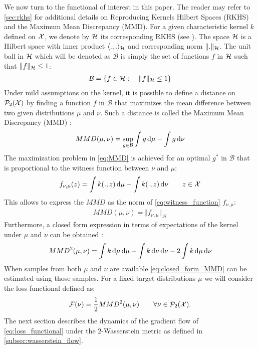We now turn to the functional of interest in this paper. The reader may refer to \cref{sec:rkhs} for additional details on Reproducing Kernels Hilbert Spaces (RKHS) and the Maximum Mean Discrepancy (MMD). For a given characteristic kernel $k$ defined on ${{\mathcal X}}$, we denote by ${{\mathcal H}}$ its corresponding RKHS (see \cite{smola1998learning}). The space ${{\mathcal H}}$ is a Hilbert space with inner product $\langle .,. \rangle_{{{\mathcal H}}}$ and corresponding norm $\Vert . \Vert_{{{\mathcal H}}}$. The unit ball in ${{\mathcal H}}$ which will be denoted as $\mathcal{B}$ is simply the set of functions $f$ in ${{\mathcal H}}$ such that $\Vert f\Vert_{{{\mathcal H}}}\leq 1 $:
\begin{align}\label{eq:unit_ball_RKHS}
\mathcal{B} = \{ f\in {{\mathcal H}} : \quad \Vert f\Vert_{{{\mathcal H}}}\leq 1 \}
\end{align}
 Under mild assumptions on the kernel, it is possible to define a distance on $\mathcal{P}_2({{\mathcal X}})$ by finding a function $f$ in $\mathcal{B}$ that maximizes the mean difference between two given distributions $\mu$ and $\nu$. Such a distance is called the Maximum Mean Discrepancy  (MMD) \cite{Gretton:2012}:
\begin{align}\label{eq:MMD}
MMD(\mu,\nu) = \sup_{g\in \mathcal{B}} \int g\mathop{}\!\mathrm{d}\mu - \int g \mathop{}\!\mathrm{d}\nu
\end{align}
The maximization problem in \cref{eq:MMD} is achieved for an optimal $g^*$ in $\mathcal{B}$ that is proportional to the  witness function between $\nu$ and $\mu$:
\begin{align}\label{eq:witness_function}
f_{\nu,\mu}(z) = \int k(.,z)\mathop{}\!\mathrm{d} \mu - \int k(.,z)\mathop{}\!\mathrm{d} \nu  \qquad z\in {{\mathcal X}}
\end{align}
This allows to express the $MMD$ as the norm of \cref{eq:witness_function} $f_{\nu,\mu}$:
\begin{align}\label{eq:mmd_norm_witness}
MMD(\mu,\nu) = \Vert f_{\nu,\mu} \Vert_{\mathcal{H}} 
\end{align}
Furthermore, a closed form expression in terms of expectations of the kernel under $\mu$ and $\nu$ can be obtained \cite{gretton2012kernel}:
\begin{align}\label{eq:closed_form_MMD}
MMD^2(\mu,\nu) = \int k\mathop{}\!\mathrm{d}\mu \mathop{}\!\mathrm{d}\mu + \int k\mathop{}\!\mathrm{d}\nu \mathop{}\!\mathrm{d} \nu - 2\int k\mathop{}\!\mathrm{d}\mu \mathop{}\!\mathrm{d} \nu
\end{align}
When samples from both $\mu$ and $\nu$ are available \cref{eq:closed_form_MMD} can be estimated using those samples. For a fixed target distributions $\mu$ we will consider the loss functional defined as:
\begin{align}\label{eq:loss_functional}
{{\mathcal F}}(\nu) = \frac{1}{2} MMD^2(\mu,\nu) \qquad \forall \nu \in \mathcal{P}_2({{\mathcal X}}).
\end{align}
The next section describes the dynamics of the gradient flow of \cref{eq:loss_functional} under the $2$-Wasserstein metric as defined in \cref{subsec:wasserstein_flow}.
